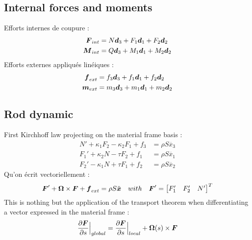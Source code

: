 \subsection{Internal forces and moments}
Efforts internes de coupure :
\begin{subequations}
	\begin{align}
		\boldsymbol{F}_{int} &= N\boldsymbol{d}_3 + F_1\boldsymbol{d}_1 + F_2\boldsymbol{d}_2
		\\
		\boldsymbol{M}_{int} &= Q\boldsymbol{d}_3 + M_1\boldsymbol{d}_1 + M_2\boldsymbol{d}_2
	\end{align}
\end{subequations}
Efforts externes appliqués linéiques :
\begin{subequations}
	\begin{align}
		\boldsymbol{f}_{ext} &= f_3\boldsymbol{d}_3 + f_1\boldsymbol{d}_1 + f_2\boldsymbol{d}_2
		\\
		\boldsymbol{m}_{ext} &= m_3\boldsymbol{d}_3 + m_1\boldsymbol{d}_1 + m_2\boldsymbol{d}_2
	\end{align}
\end{subequations}

\subsection{Rod dynamic}

First Kirchhoff law projecting on the material frame basis :
\begin{subequations}
	\begin{align}
		N' + \kappa_1 F_2 - \kappa_2 F_1 + f_3 &= \rho S \ddot{x_3}
		\label{eq:K1_3}\\
		F_1' + \kappa_2 N - \tau F_2 + f_1 &= \rho S \ddot{x_1}
		\label{eq:K1_1}\\
		F_2' - \kappa_1 N + \tau F_1 + f_2 &= \rho S \ddot{x_2}
		\label{eq:K1_2}
	\end{align}
\end{subequations}
Qu'on écrit vectoriellement : 
\begin{equation}
	\boldsymbol{F}' + \boldsymbol{\Omega} \times \boldsymbol{F} + \boldsymbol{f}_{ext} = \rho S \ddot{\boldsymbol{x}} 
	\quad with \quad
	\boldsymbol{F}' = 
	\begin{bmatrix}F'_1 & F'_2 & N'\end{bmatrix}^T
\end{equation}
This is nothing but the application of the transport theorem when differentiating a vector expressed in the material frame : 
\begin{equation}
	\frac{\partial \boldsymbol{F}}{\partial s}\Bigr|_{global} = \frac{\partial \boldsymbol{F}}{\partial s}\Bigr|_{local} + \boldsymbol{\Omega}(s) \times \boldsymbol{F}
\end{equation}

